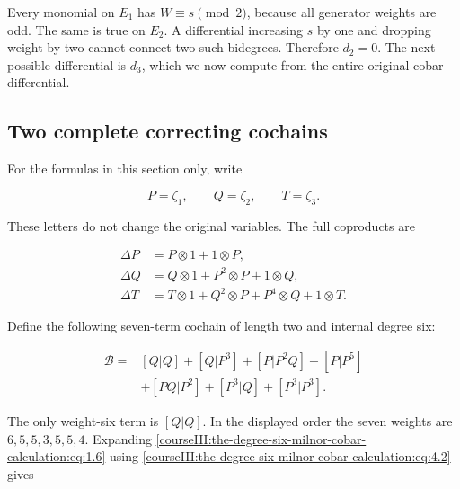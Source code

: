Every monomial on \(E_1\) has \(W\equiv s\pmod2\), because all generator weights are odd. The same is true on \(E_2\). A differential increasing \(s\) by one and dropping weight by two cannot connect two such bidegrees. Therefore \(d_2=0\). The next possible differential is \(d_3\), which we now compute from the entire original cobar differential.

\label{courseIII:the-degree-six-milnor-cobar-calculation:six-cobar-exact-corrections}

\subsection{Two complete correcting cochains}
\label{courseIII:the-degree-six-milnor-cobar-calculation:section-4}

For the formulas in this section only, write

\begin{equation}
P=\zeta_1,\qquad Q=\zeta_2,\qquad T=\zeta_3.
 \label{courseIII:the-degree-six-milnor-cobar-calculation:eq:4.1}
\end{equation}

These letters do not change the original variables. The full coproducts are

\begin{equation}
\begin{aligned}
 \Delta P&=P\otimes1+1\otimes P,\\
 \Delta Q&=Q\otimes1+P^2\otimes P+1\otimes Q,\\
 \Delta T&=T\otimes1+Q^2\otimes P+P^4\otimes Q+1\otimes T.
\end{aligned}
\label{courseIII:the-degree-six-milnor-cobar-calculation:eq:4.2}
\end{equation}

Define the following seven-term cochain of length two and internal degree six:

\begin{equation}
\begin{aligned}
 \mathcal B={}&[Q|Q]+[Q|P^3]+[P|P^2Q]+[P|P^5]\\
              &+[PQ|P^2]+[P^3|Q]+[P^3|P^3].
\end{aligned}
\label{courseIII:the-degree-six-milnor-cobar-calculation:eq:4.3}
\end{equation}

The only weight-six term is \([Q|Q]\). In the displayed order the seven weights are \(6,5,5,3,5,5,4\). Expanding \eqref{courseIII:the-degree-six-milnor-cobar-calculation:eq:1.6} using \eqref{courseIII:the-degree-six-milnor-cobar-calculation:eq:4.2} gives

